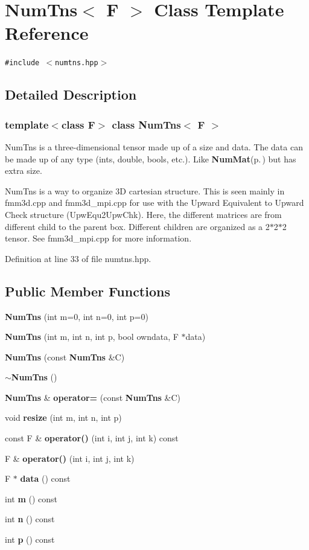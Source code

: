 \section{Num\-Tns$<$ F $>$ Class Template Reference}
\label{classNumTns}
{\tt \#include $<$numtns.hpp$>$}



\subsection{Detailed Description}
\subsubsection*{template$<$class F$>$ class Num\-Tns$<$ F $>$}

Num\-Tns is a three-dimensional tensor made up of a size and data. The data can be made up of any type (ints, double, bools, etc.). Like {\bf Num\-Mat}{\rm (p.\,\pageref{classNumMat})} but has extra size. 

Num\-Tns is a way to organize 3D cartesian structure. This is seen mainly in fmm3d.cpp and fmm3d\_\-mpi.cpp for use with the Upward Equivalent to Upward Check structure (Upw\-Equ2Upw\-Chk). Here, the different matrices are from different child to the parent box. Different children are organized as a 2$\ast$2$\ast$2 tensor. See fmm3d\_\-mpi.cpp for more information. 



Definition at line 33 of file numtns.hpp.\subsection*{Public Member Functions}
\begin{CompactItemize}
\item 
{\bf Num\-Tns} (int m=0, int n=0, int p=0)
\item 
{\bf Num\-Tns} (int m, int n, int p, bool owndata, F $\ast$data)
\item 
{\bf Num\-Tns} (const {\bf Num\-Tns} \&C)
\item 
{\bf $\sim$Num\-Tns} ()
\item 
{\bf Num\-Tns} \& {\bf operator=} (const {\bf Num\-Tns} \&C)
\item 
void {\bf resize} (int m, int n, int p)
\item 
const F \& {\bf operator()} (int i, int j, int k) const 
\item 
F \& {\bf operator()} (int i, int j, int k)
\item 
F $\ast$ {\bf data} () const 
\item 
int {\bf m} () const 
\item 
int {\bf n} () const 
\item 
int {\bf p} () const 
\end{CompactItemize}
